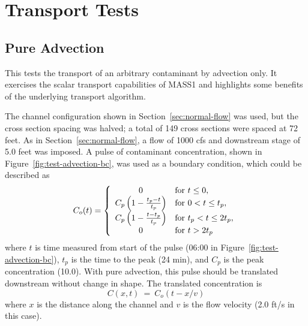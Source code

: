 \documentclass[12pt,dvips,letterpaper]{article}
\begin{document}
\section{Transport Tests}
\label{sec:transport-tests}


\subsection{Pure Advection}
\label{sec:test-advection-1-link}

This tests the transport of an arbitrary contaminant by advection
only.  It exercises the scalar transport capabilities of MASS1 and
highlights some benefits of the underlying transport algorithm.  

The channel configuration shown in Section~\ref{sec:normal-flow} was
used, but the cross section spacing was halved; a total of 149 cross
sections were spaced at 72 feet.  As in Section~\ref{sec:normal-flow},
a flow of 1000 cfs and downstream stage of 5.0 feet was imposed. A pulse
of contaminant concentration, shown in
Figure~\ref{fig:test-advection-bc}, was used as a boundary condition,
which could be described as
\begin{equation}
  \label{eq:advection-bc-conc}
  C_{o}(t) = \left\{ 
    \begin{array}[c]{cl}
      0 & \mathrm{for} ~ t \le 0, \\
      C_{p} \left( 1 - { { t_{p} - t } \over { t_{p} } } \right) &
      \mathrm{for} ~ 0 < t \le t_{p}, \\
      C_{p} \left( 1 - { { t - t_{p} } \over { t_{p} } } \right) &
      \mathrm{for} ~ t_{p} < t \le 2 t_{p}, \\
      0 & \mathrm{for} ~ t > 2 t_{p}
    \end{array} 
  \right.   
\end{equation}
where $t$ is time measured from start of the pulse (06:00 in
Figure~\ref{fig:test-advection-bc}), $t_{p}$ is the time to the peak
(24 min), and $C_{p}$ is the peak concentration (10.0).  With pure
advection, this pulse should be translated downstream without change in
shape.  The translated concentration is
\[
  C(x, t) ~ = ~ C_{o}(t - x/v)
\]
where $x$ is the distance along the channel and $v$ is the flow
velocity (2.0 ft/s in this case).  
\end{document}
